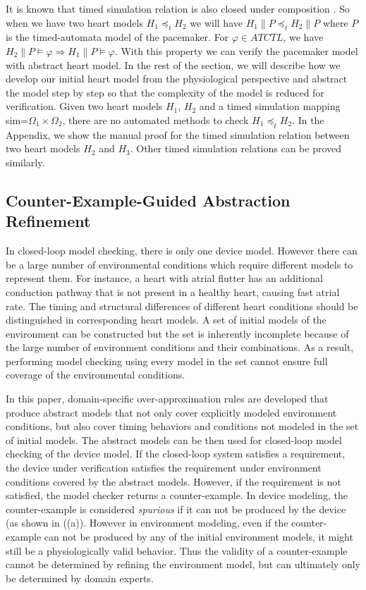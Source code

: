 It is known that timed simulation relation is also closed under composition \cite{simulation}. So when we have two heart models $H_1\preceq_t H_2$ we will have $H_1\| P\preceq_t H_2\| P$ where $P$ is the timed-automata model of the pacemaker. For $\varphi\in ATCTL$, we have $H_2\| P\models\varphi\Rightarrow H_1\| P\models\varphi$. With this property we can verify the pacemaker model with abstract heart model. In the rest of the section, we will describe how we develop our initial heart model from the physiological perspective and abstract the model step by step so that the complexity of the model is reduced for verification. Given two heart models $H_1$, $H_2$ and a timed simulation mapping \textsf{sim}=$\Omega_1\times\Omega_2$, there are no automated methods to check $H_1\preceq_t H_2$. In the Appendix, we show the manual proof for the timed simulation relation between two heart models $H_2$ and $H_3$. Other timed simulation relations can be proved similarly.

\subsection{Counter-Example-Guided Abstraction Refinement}
In closed-loop model checking, there is only one device model. 
However there can be a large number of environmental conditions which require different models to represent them. For instance, a heart with atrial flutter has an additional conduction pathway that is not present in a healthy heart, causing fast atrial rate. The timing and structural differences of different heart conditions should be distinguished in corresponding heart models.
A set of initial models of the environment can be constructed but the set is inherently incomplete because of the large number of environment conditions and their combinations. 
As a result, performing model checking using every model in the set cannot ensure full coverage of the environmental conditions. 

In this paper, domain-specific over-approximation rules are developed that produce abstract models that not only cover explicitly modeled environment conditions, but also cover timing behaviors and conditions not modeled in the set of initial models. 
The abstract models can be then used for closed-loop model checking of the device model. 
If the closed-loop system satisfies a requirement, the device under verification satisfies the requirement under environment conditions covered by the abstract models. 
However, if the requirement is not satisfied, the model checker returns a counter-example. 
In device modeling, the counter-example is considered \emph{spurious} if it can not be produced by the device (as shown in ((a)).
However in environment modeling, even if the counter-example can not be produced by any of the initial environment models, it might still be a physiologically valid behavior.
Thus the validity of a counter-example cannot be determined by refining the environment model, but can ultimately only be determined by domain experts. 

